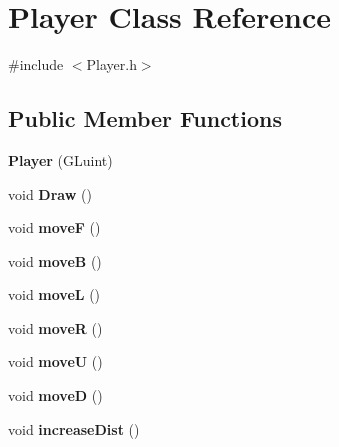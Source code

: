 \hypertarget{classPlayer}{}\section{Player Class Reference}
\label{classPlayer}


{\ttfamily \#include $<$Player.\+h$>$}

\subsection*{Public Member Functions}
\begin{DoxyCompactItemize}
\item 
{\bfseries Player} (G\+Luint)\hypertarget{classPlayer_a0f090add8ef5ced1841e7e3517e09c09}{}\label{classPlayer_a0f090add8ef5ced1841e7e3517e09c09}

\item 
void {\bfseries Draw} ()\hypertarget{classPlayer_a00ae3ebe88af8f9cfabd819176516a73}{}\label{classPlayer_a00ae3ebe88af8f9cfabd819176516a73}

\item 
void {\bfseries moveF} ()\hypertarget{classPlayer_a62dfb3a0d78231f2247aedbe28f2e4a6}{}\label{classPlayer_a62dfb3a0d78231f2247aedbe28f2e4a6}

\item 
void {\bfseries moveB} ()\hypertarget{classPlayer_a7f941c85236bbf5007f7cc4d584d8837}{}\label{classPlayer_a7f941c85236bbf5007f7cc4d584d8837}

\item 
void {\bfseries moveL} ()\hypertarget{classPlayer_a3cb72f5babfc5e06a02a06a99cda0d5e}{}\label{classPlayer_a3cb72f5babfc5e06a02a06a99cda0d5e}

\item 
void {\bfseries moveR} ()\hypertarget{classPlayer_aecdd233e935159c57e9adf69ac3c1e14}{}\label{classPlayer_aecdd233e935159c57e9adf69ac3c1e14}

\item 
void {\bfseries moveU} ()\hypertarget{classPlayer_a813cc9bf7d1fee3db6fa863ebbcac502}{}\label{classPlayer_a813cc9bf7d1fee3db6fa863ebbcac502}

\item 
void {\bfseries moveD} ()\hypertarget{classPlayer_a7c99fd3922f9f3af779d8611be236853}{}\label{classPlayer_a7c99fd3922f9f3af779d8611be236853}

\item 
void {\bfseries increase\+Dist} ()\hypertarget{classPlayer_ad24db387f2a91dacbd225c1ab658ebde}{}\label{classPlayer_ad24db387f2a91dacbd225c1ab658ebde}


\end{DoxyCompactItemize}
